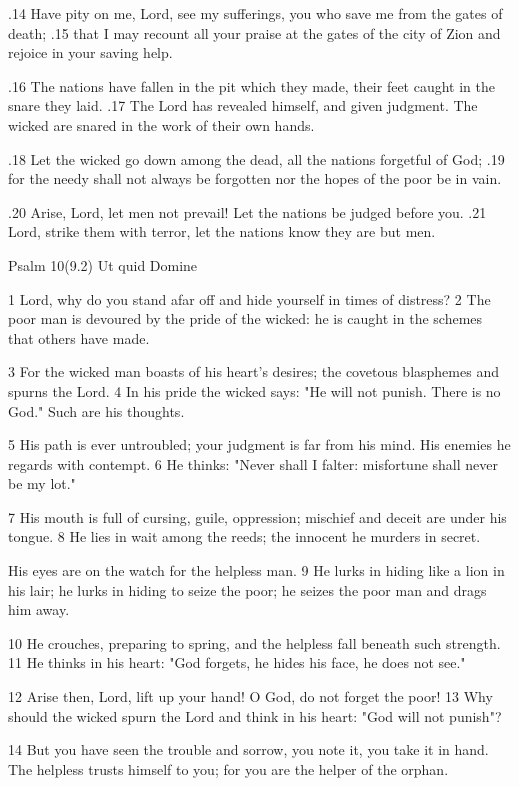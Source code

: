 .14 Have pity on me, Lord, see my sufferings,
you who save me from the gates of death;
.15 that I may recount all your praise
at the gates of the city of Zion
and rejoice in your saving help.

.16 The nations have fallen in the pit which they made,
their feet caught in the snare they laid.
.17 The Lord has revealed himself, and given judgment.
The wicked are snared in the work of their own hands.

.18 Let the wicked go down among the dead,
all the nations forgetful of God;
.19 for the needy shall not always be forgotten
nor the hopes of the poor be in vain.

.20 Arise, Lord, let men not prevail!
Let the nations be judged before you.
.21 Lord, strike them with terror,
let the nations know they are but men.


Psalm 10(9.2) Ut quid Domine

1 Lord, why do you stand afar off
and hide yourself in times of distress?
2 The poor man is devoured by the pride of the wicked:
he is caught in the schemes that others have made.

3 For the wicked man boasts of his heart's desires;
the covetous blasphemes and spurns the Lord.
4 In his pride the wicked says: "He will not punish.
There is no God." Such are his thoughts.

5 His path is ever untroubled;
your judgment is far from his mind.
His enemies he regards with contempt.
6 He thinks: "Never shall I falter:
misfortune shall never be my lot."

7 His mouth is full of cursing, guile, oppression;
mischief and deceit are under his tongue.
8 He lies in wait among the reeds;
the innocent he murders in secret.

His eyes are on the watch for the helpless man.
9 He lurks in hiding like a lion in his lair;
he lurks in hiding to seize the poor;
he seizes the poor man and drags him away.

10 He crouches, preparing to spring,
and the helpless fall beneath such strength.
11 He thinks in his heart: "God forgets,
he hides his face, he does not see."

12 Arise then, Lord, lift up your hand!
O God, do not forget the poor!
13 Why should the wicked spurn the Lord
and think in his heart: "God will not punish"?

14 But you have seen the trouble and sorrow,
you note it, you take it in hand.
The helpless trusts himself to you;
for you are the helper of the orphan.

